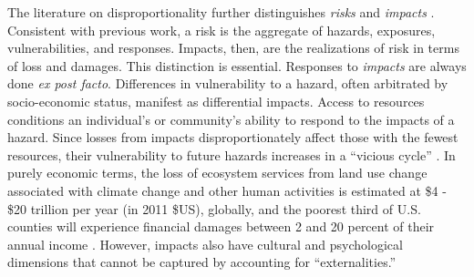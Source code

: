 The literature on disproportionality further distinguishes \textit{risks} and
\textit{impacts} \cite{dorkenoo_critical_2022}. Consistent with previous work, a
risk is the aggregate of hazards, exposures, vulnerabilities, and responses.
Impacts, then, are the realizations of risk in terms of loss and damages. This
distinction is essential. Responses to \textit{impacts} are always done
\textit{ex post facto}. Differences in vulnerability to a hazard, often
arbitrated by socio-economic status, manifest as differential impacts. Access to
resources conditions an individual's or community's ability to respond to the
impacts of a hazard. Since losses from impacts disproportionately affect those
with the fewest resources, their vulnerability to future hazards increases in a
``vicious cycle'' \cite{islam_climate_2017, dorkenoo_critical_2022}. In purely
economic terms, the loss of ecosystem services from land use change associated
with climate change and other human activities is estimated at \$4 - \$20
trillion per year (in 2011 \$US), globally, \cite{costanza_changes_2014} and the
poorest third of U.S. counties will experience financial damages between 2 and
20 percent of their annual income \cite{hsiang_estimating_2017}. However,
impacts also have cultural and psychological dimensions
\cite{dorkenoo_critical_2022} that cannot be captured by accounting for
``externalities.''

\noindent\hrulefill



